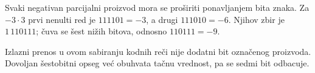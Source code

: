 Svaki negativan parcijalni proizvod mora se proširiti ponavljanjem bita znaka. Za $-3\cdot3$ prvi nenulti red je $111101=-3$, a drugi $111010=-6$. Njihov zbir je $1\,110111$; čuva se šest nižih bitova, odnosno $110111=-9$.

Izlazni prenos u ovom sabiranju kodnih reči nije dodatni bit označenog proizvoda. Dovoljan šestobitni opseg već obuhvata tačnu vrednost, pa se sedmi bit odbacuje.
